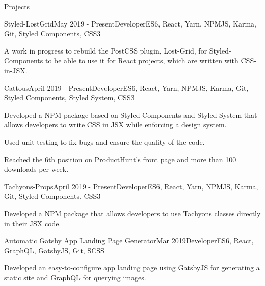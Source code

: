 \documentclass{resume} %
\begin{document}
\begin{rSection}{Projects}

\begin{rSubsection}{Styled-LostGrid}{May 2019 - Present}{Developer}{ES6, React, Yarn, NPMJS, Karma, Git, Styled Components, CSS3}
\item A work in progress to rebuild the PostCSS plugin, Lost-Grid, for Styled-Components to be able to use it for React projects, which are written with CSS-in-JSX.
\end{rSubsection}

\begin{rSubsection}{Cattous}{April 2019 - Present}{Developer}{ES6, React, Yarn, NPMJS, Karma, Git, Styled Components, Styled System, CSS3}
\item Developed a NPM package based on Styled-Components and Styled-System that allows developers to write CSS in JSX while enforcing a design system.
\item Used unit testing to fix bugs and ensure the quality of the code.
\item Reached the 6th position on ProductHunt's front page and more than 100 downloads per week.
\end{rSubsection}

\begin{rSubsection}{Tachyons-Props}{April 2019 - Present}{Developer}{ES6, React, Yarn, NPMJS, Karma, Git, Styled Components, CSS3}
\item Developed a NPM package that allows developers to use Tachyons classes directly in their JSX code.
\end{rSubsection}

\begin{rSubsection}{Automatic Gatsby App Landing Page Generator}{Mar 2019}{Developer}{ES6, React, GraphQL, GatsbyJS, Git, SCSS}
\item Developed an easy-to-configure app landing page using GatsbyJS for generating a static site and GraphQL for querying images.
\end{rSubsection}


\end{rSection}
\end{document}
